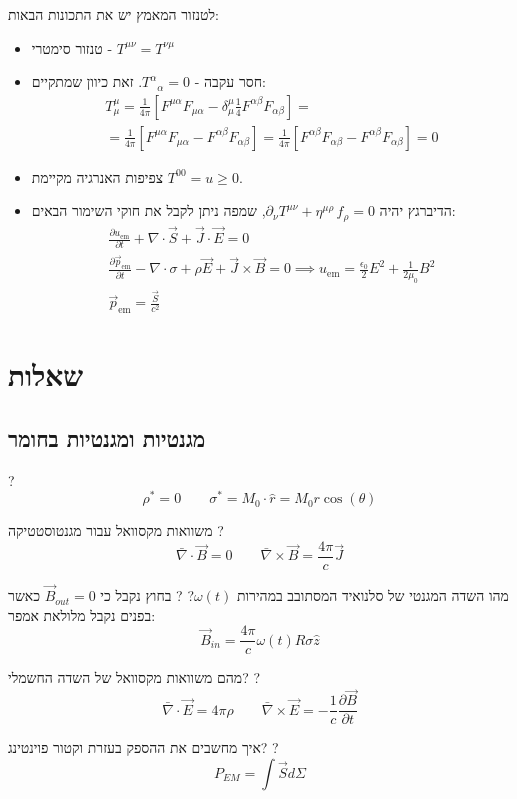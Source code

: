 \documentclass{tstextbook}
\begin{document}
\begin{proposition}
לטנזור המאמץ יש את התכונות הבאות:

  \begin{itemize}
    \item טנזור סימטרי - \(T^{\mu \nu}=T^{\nu \mu}\)
    \item חסר עקבה - \({T^{\alpha}}_{\alpha}=0\). זאת כיוון שמתקיים:
\begin{gather*}T_{\mu}^{\mu}=\frac{1}{4\pi}\left[F^{\mu\alpha}F_{\mu\alpha}-\delta_{\mu}^{\mu}\frac{1}{4}F^{\alpha\beta}F_{\alpha\beta}\right] =\\=\frac{1}{4\pi}\left[F^{\mu\alpha}F_{\mu\alpha}-F^{\alpha\beta}F_{\alpha\beta}\right]=\frac{1}{4\pi}\left[F^{\alpha\beta}F_{\alpha\beta}-F^{\alpha\beta}F_{\alpha\beta}\right]=0
\end{gather*}
    \item צפיפות האנרגיה מקיימת \(T^{00}=u\geq 0\).
    \item הדיברגץ יהיה \(\partial_{\nu}T^{\mu\nu}+\eta^{\mu\rho}\,f_{\rho}=0\), שמפה ניתן לקבל את חוקי השימור הבאים:
\begin{gather*}{\frac{\partial u_{\mathrm{em}}}{\partial t}}+\nabla\cdot\vec{S}+\vec{J}\cdot\vec{E}=0 \\{\frac{\partial{\vec p}_{\mathrm{em}}}{\partial t}}-\nabla\cdot\sigma+\rho{\vec E}+{\vec J}\times{\vec B}=0\implies u_{\mathrm{em}}={\frac{\epsilon_{0}}{2}}E^{2}+{\frac{1}{2\mu_{0}}}B^{2} \\\vec{p}_{\mathrm{em}}={\frac{\vec{S}}{c^{2}}}
\end{gather*}
  \end{itemize}
\end{proposition}
\chapter{שאלות}

\section{מגנטיות ומגנטיות בחומר}

?
$$\rho^* =0\qquad\sigma^{*}=M_{0}\cdot \hat{r}=M_{0}r\cos\left( \theta \right)$$

משוואות מקסוואל עבור מגנטוסטטיקה
?
$$\bar{\nabla} \cdot \vec{B}=0\qquad \bar{\nabla} \times \vec{B} = \frac{4\pi}{c}\vec{J}$$

מהו השדה המגנטי של סלנואיד המסתובב במהירות \(\omega(t)\)?
?
בחוץ נקבל כי \(\vec{B}_{out}=0\) כאשר בפנים נקבל מלולאת אמפר:
$$\vec{B}_{in}=\frac{4\pi}{c}\omega(t)R\sigma \hat{z}$$

מהם משוואות מקסוואל של השדה החשמלי?
?
$$\bar{\nabla} \cdot \vec{E}=4\pi \rho \qquad  \bar{\nabla} \times \vec{E}=-\frac{1}{c}\frac{\partial \vec{B}}{\partial t} $$

איך מחשבים את ההספק בעזרת וקטור פוינטינג?
?
$$P_{EM}=\int \vec{S} d\Sigma$$
\end{document}
